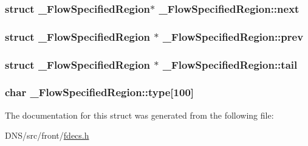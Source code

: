 \subsubsection[{\texorpdfstring{next}{next}}]{\setlength{\rightskip}{0pt plus 5cm}struct {\bf \+\_\+\+Flow\+Specified\+Region}$\ast$ \+\_\+\+Flow\+Specified\+Region\+::next}\hypertarget{struct___flow_specified_region_a6498b836807b6b21689af01da4af0439}{}\label{struct___flow_specified_region_a6498b836807b6b21689af01da4af0439}
\subsubsection[{\texorpdfstring{prev}{prev}}]{\setlength{\rightskip}{0pt plus 5cm}struct {\bf \+\_\+\+Flow\+Specified\+Region} $\ast$ \+\_\+\+Flow\+Specified\+Region\+::prev}\hypertarget{struct___flow_specified_region_a51ef4882bf1c349a6bc4a23c600ad0a4}{}\label{struct___flow_specified_region_a51ef4882bf1c349a6bc4a23c600ad0a4}
\subsubsection[{\texorpdfstring{tail}{tail}}]{\setlength{\rightskip}{0pt plus 5cm}struct {\bf \+\_\+\+Flow\+Specified\+Region} $\ast$ \+\_\+\+Flow\+Specified\+Region\+::tail}\hypertarget{struct___flow_specified_region_a2a325be693b70780a41515fce2a235e9}{}\label{struct___flow_specified_region_a2a325be693b70780a41515fce2a235e9}
\subsubsection[{\texorpdfstring{type}{type}}]{\setlength{\rightskip}{0pt plus 5cm}char \+\_\+\+Flow\+Specified\+Region\+::type\mbox{[}100\mbox{]}}\hypertarget{struct___flow_specified_region_a67b785a9f602ba9ff1ef48c6ed4a48c0}{}\label{struct___flow_specified_region_a67b785a9f602ba9ff1ef48c6ed4a48c0}


The documentation for this struct was generated from the following file\+:\begin{DoxyCompactItemize}
\item 
D\+N\+S/src/front/\hyperlink{fdecs_8h}{fdecs.\+h}\end{DoxyCompactItemize}
